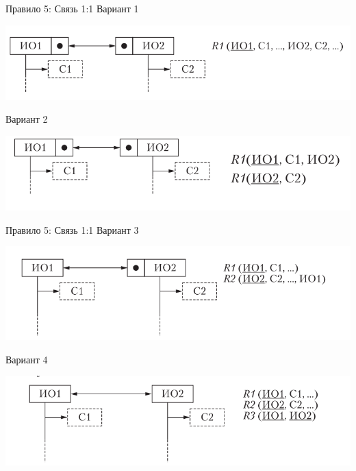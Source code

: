 \documentclass{beamer}
\begin{document}
\begin{frame}{Правило 5: Связь 1:1}
Вариант 1
\begin{center}
\includegraphics[scale=0.4]{images/lec03-pic15.png}
\end{center}
Вариант 2
\begin{center}
\includegraphics[scale=0.4]{images/lec03-pic16.png}
\end{center}
\end{frame}

\begin{frame}{Правило 5: Связь 1:1}
Вариант 3
\begin{center}
\includegraphics[scale=0.4]{images/lec03-pic17.png}
\end{center}
Вариант 4
\begin{center}
\includegraphics[scale=0.5]{images/lec03-pic18.png}
\end{center}
\end{frame}
\end{document}
